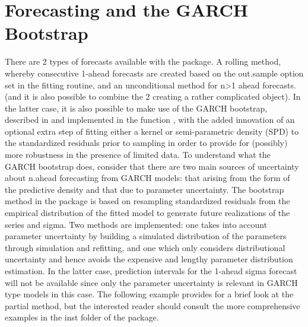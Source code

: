 \section{Forecasting and the GARCH Bootstrap}\label{section:forecasting}
There are 2 types of forecasts available with the package. A rolling method,
whereby consecutive 1-ahead forecasts are created based on the out.sample option
set in the fitting routine, and an unconditional method for n>1 ahead forecasts.
(and it is also possible to combine the 2 creating a rather complicated object).
In the latter case, it is also possible to make use of the GARCH bootstrap,
described in \cite{Pascual2006} and implemented in the function \verb@ugarchboot@,
with the added innovation of an optional extra  step of fitting either a kernel
or semi-parametric density (SPD) to the standardized residuals prior to sampling
in order to provide for (possibly) more robustness  in the presence of limited data.
To understand what the GARCH bootstrap does, consider that there are two main
sources of uncertainty about n.ahead forecasting from GARCH models: that arising
from the form of the predictive density and that due to parameter uncertainty.
The bootstrap method in the \verb@rugarch@ package is based on
resampling standardized residuals from the empirical distribution of the fitted model
to generate future realizations of the series and sigma. Two methods are implemented:
one takes into account parameter uncertainty by building a simulated distribution
of the parameters through simulation and refitting, and one which only considers
distributional uncertainty and hence avoids the expensive and lengthy parameter
distribution estimation. In the latter case, prediction intervals for the 1-ahead sigma
forecast will not be available since only the parameter uncertainty is relevant in
GARCH type models in this case. The following example provides for a brief look at the
partial method, but the interested reader should consult the more comprehensive examples
in the inst folder of the package.
